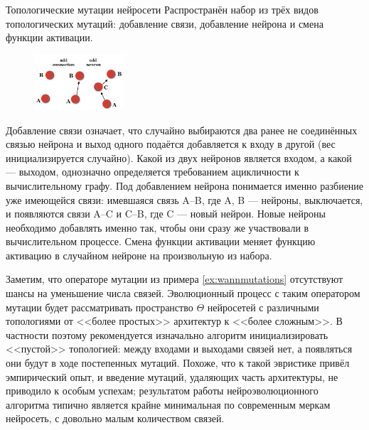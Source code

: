 \begin{exampleBox}[label=ex:wannmutations]{Топологические мутации нейросети}
Распространён набор из трёх видов топологических мутаций: добавление связи, добавление нейрона и смена функции активации. 

\begin{figure}
\centering
\vspace{-0.5cm}
\includegraphics[width=0.3\textwidth]{Images/topologymutation.png}
\vspace{-1cm}
\end{figure}

Добавление связи означает, что случайно выбираются два ранее не соединённых связью нейрона и выход одного подаётся добавляется к входу в другой (вес инициализируется случайно). Какой из двух нейронов является входом, а какой --- выходом, однозначно определяется требованием ацикличности к вычислительному графу. Под добавлением нейрона понимается именно разбиение уже имеющейся связи: имевшаяся связь A--B, где A, B --- нейроны, выключается, и появляются связи A--C и C--B, где C --- новый нейрон. Новые нейроны необходимо добавлять именно так, чтобы они сразу же участвовали в вычислительном процессе. Смена функции активации меняет функцию активацию в случайном нейроне на произвольную из набора.
\end{exampleBox}

\begin{remark}
Заметим, что операторе мутации из примера \ref{ex:wannmutations} отсутствуют шансы на уменьшение числа связей. Эволюционный процесс с таким оператором мутации будет рассматривать пространство $\Theta$ нейросетей с различными топологиями от <<более простых>> архитектур к <<более сложным>>. В частности поэтому рекомендуется изначально алгоритм инициализировать <<пустой>> топологией: между входами и выходами связей нет, а появляться они будут в ходе постепенных мутаций. Похоже, что к такой эвристике привёл эмпирический опыт, и введение мутаций, удаляющих часть архитектуры, не приводило к особым успехам; результатом работы нейроэволюционного алгоритма типично является крайне минимальная по современным меркам нейросеть, с довольно малым количеством связей.
\end{remark}

